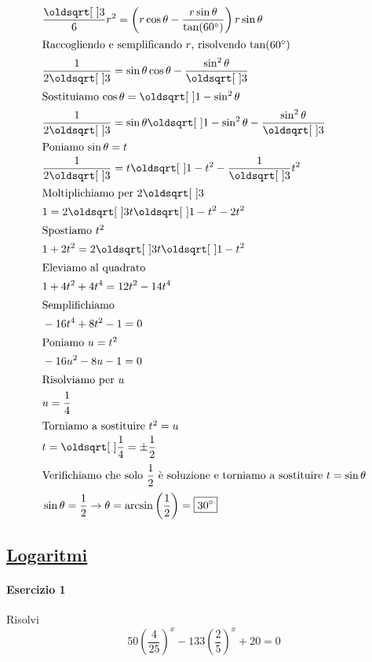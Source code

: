 \begin{align*}
  &\frac{\sqrt{3}}{6}r^2 = \left(r\cos\theta - \frac{r\sin\theta}{\tan(\ang{60})}\right)r\sin\theta\\
  \intertext{Raccogliendo e semplificando $r$, risolvendo $\tan(\ang{60})$}
  &\frac{1}{2\sqrt{3}} = \sin\theta\cos\theta -\frac{\sin^2\theta}{\sqrt{3}}\\
  \intertext{Sostituiamo $\cos\theta = \sqrt{1-\sin^2\theta}$}
  &\frac{1}{2\sqrt{3}} = \sin\theta\sqrt{1-\sin^2\theta}-\frac{\sin^2\theta}{\sqrt{3}}\\
  \intertext{Poniamo $\sin\theta = t$}
  &\frac{1}{2\sqrt{3}} = t\sqrt{1-t^2}-\frac{1}{\sqrt{3}}t^2\\
  \intertext{Moltiplichiamo per $2\sqrt{3}$}
  &1 = 2\sqrt{3}t\sqrt{1-t^2}-2t^2\\
  \intertext{Spostiamo $t^2$}
  &1+2t^2 = 2\sqrt{3}t\sqrt{1-t^2}\\
  \intertext{Eleviamo al quadrato}
  &1+4t^2+4t^4 = 12t^2-14t^4\\
  \intertext{Semplifichiamo}
  &-16t^4+8t^2-1=0\\
  \intertext{Poniamo $u = t^2$}
  &-16u^2-8u-1=0\\
  \intertext{Risolviamo per $u$}
  &u = \frac{1}{4}\\
  \intertext{Torniamo a sostituire $t^2=u$}
  &t = \sqrt{\frac{1}{4}} = \pm\frac{1}{2}\\
  \intertext{Verifichiamo che solo $\dfrac{1}{2}$ è soluzione e torniamo a sostituire $t = \sin\theta$}
  &\sin\theta = \frac{1}{2} \rightarrow \theta = \arcsin\left(\frac{1}{2}\right) = \boxed{\ang{30}}
\end{align*}

\subsection*{\hyperref[sec:logaritmi]{Logaritmi}}\label{ex:logaritmi}
\paragraph{Esercizio 1}
Risolvi
\begin{equation*}
  50\left(\frac{4}{25}\right)^x-133\left(\frac{2}{5}\right)^x+20=0
\end{equation*}
\divisor

